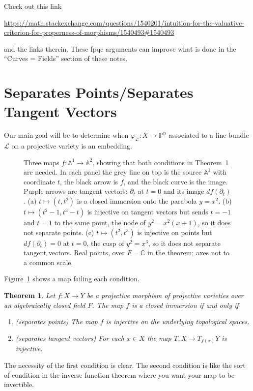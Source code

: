 \documentclass[12pt]{article}
\numberwithin{equation}{section}
\newtheorem{theorem}{Theorem}[subsection]
\theoremstyle{definition}
\theoremstyle{remark}
\newcommand{\CC}{\mathbb{C}}
\newcommand{\PP}{\mathbb{P}}
\renewcommand{\AA}{\mathbb{A}}
\newcommand{\Lcal}{\mathcal{L}}
\begin{document}
Check out this link
\begin{center}
	\url{https://math.stackexchange.com/questions/1540201/intuition-for-the-valuative-criterion-for-properness-of-morphisms/1540493#1540493}
\end{center}
and the links therein. These fpqc arguments can improve what is done in the ``Curves = Fields'' section of these notes.

\section{Separates Points/Separates Tangent Vectors}

Our main goal will be to determine when $\varphi_{\Lcal}:X \to \PP^n$ associated to a line bundle $\Lcal$ on a projective variety is an embedding.
\begin{figure}[H]
\centering

\caption{Three maps $f\colon\AA^1\to\AA^2$, showing that both conditions in Theorem~\ref{thm:points-and-tangents} are needed. In each panel the grey line on top is the source $\AA^1$ with coordinate $t$, the black arrow is $f$, and the black curve is the image. Purple arrows are tangent vectors: $\partial_t$ at $t=0$ and its image $df(\partial_t)$. (a) $t\mapsto(t,t^2)$ is a closed immersion onto the parabola $y=x^2$. (b) $t\mapsto(t^2-1,t^3-t)$ is injective on tangent vectors but sends $t=-1$ and $t=1$ to the same point, the node of $y^2=x^2(x+1)$, so it does not separate points. (c) $t\mapsto(t^2,t^3)$ is injective on points but $df(\partial_t)=0$ at $t=0$, the cusp of $y^2=x^3$, so it does not separate tangent vectors. Real points, over $F=\CC$ in the theorem; axes not to a common scale.}\label{fig:separate-points-tangents}
\end{figure}
Figure~\ref{fig:separate-points-tangents} shows a map failing each condition.

\begin{theorem}\label{thm:points-and-tangents}
	Let $f:X\to Y$ be a projective morphism of projective varieties over an algebraically closed field $F$. 
	The map $f$ is a closed immersion if and only if 
	\begin{enumerate}
		\item (separates points) The map $f$ is injective on the underlying topological spaces.
		\item (separates tangent vectors) For each $x\in X$ the map $T_xX \to T_{f(x)}Y$ is injective.
	\end{enumerate}
\end{theorem}
The necessity of the first condition is clear.
The second condition is like the sort of condition in the inverse function theorem where you want your map to be invertible. 
\end{document}
